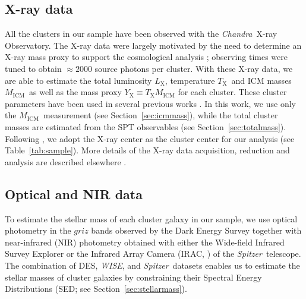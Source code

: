 \documentclass[useAMS,usenatbib,iop,numberedappendix]{mn2e}
\newcommand{\CHANDRA}{\emph{Chandra}}
\newcommand{\Spitzer}{\emph{Spitzer}}
\newcommand{\WISE}{\emph{WISE}}
\newcommand{\Lx}{\ensuremath{L_{\mathrm{X}}}}
\newcommand{\Tx}{\ensuremath{T_{\mathrm{X}}}}
\newcommand{\Mgas}{\ensuremath{M_{\mathrm{ICM}}}}
\newcommand{\Yx}{\ensuremath{Y_{\mathrm{X}}}}
\begin{document}
\subsection{X-ray data}
\label{sec:xvp_xray_data}

All the clusters in our sample have been observed with the \CHANDRA\ X-ray Observatory.
The X-ray data were largely motivated by the need to determine an X-ray mass proxy to support the cosmological analysis \citep{andersson11,benson13, bocquet15,dehaan16}; observing times were tuned to obtain $\approx2000$ source photons per cluster.
With these X-ray data, we are able to estimate the total luminosity \Lx, temperature \Tx\ and ICM masses \Mgas\ as well as the mass proxy $\Yx\equiv\Tx\Mgas$ for each cluster.  These cluster parameters have been used in several previous works \citep{benson13, mcdonald13,mcdonald14b,bocquet15, dehaan16,chiu16a}.
In this work, we use only the \Mgas\ measurement (see Section~\ref{sec:icmmass}), while the total cluster masses are estimated from the SPT observables (see Section~\ref{sec:totalmass}).  Following \cite{chiu16a}, we adopt the X-ray center as the cluster center for our analysis (see Table~\ref{tab:sample}).
More details of the X-ray data acquisition, reduction and analysis are described elsewhere \citep{andersson11,benson13,mcdonald13}.

\subsection{Optical and NIR data}
\label{sec:xvp_optical_nir_data}

To estimate the stellar mass of each cluster galaxy in our sample, we use optical photometry in the $griz$ bands observed by the Dark Energy Survey \citep{DES05,des2016morethande} together with near-infrared (NIR) photometry obtained with either the Wide-field Infrared Survey Explorer \citep[\WISE;][]{wright10} or the Infrared Array Camera (IRAC, \citealt{fazio04}) of the \Spitzer\ telescope. 
The combination of DES, \WISE, and \Spitzer\ datasets enables us to estimate the stellar masses of cluster galaxies by constraining their Spectral Energy Distributions (SED; see Section~\ref{sec:stellarmass}).
\end{document}
